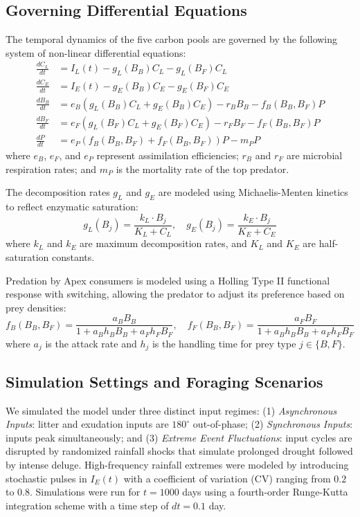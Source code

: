 \subsection{Governing Differential Equations}

The temporal dynamics of the five carbon pools are governed by the following system of non-linear differential equations:
\begin{align}
\frac{dC_L}{dt} &= I_L(t) - g_L(B_B) C_L - g_L(B_F) C_L \\
\frac{dC_E}{dt} &= I_E(t) - g_E(B_B) C_E - g_E(B_F) C_E \\
\frac{dB_B}{dt} &= e_B \left( g_L(B_B) C_L + g_E(B_B) C_E \right) - r_B B_B - f_B(B_B, B_F) P \\
\frac{dB_F}{dt} &= e_F \left( g_L(B_F) C_L + g_E(B_F) C_E \right) - r_F B_F - f_F(B_B, B_F) P \\
\frac{dP}{dt} &= e_P \left( f_B(B_B, B_F) + f_F(B_B, B_F) \right) P - m_P P
\end{align}
where $e_B$, $e_F$, and $e_P$ represent assimilation efficiencies; $r_B$ and $r_F$ are microbial respiration rates; and $m_P$ is the mortality rate of the top predator.

The decomposition rates $g_L$ and $g_E$ are modeled using Michaelis-Menten kinetics to reflect enzymatic saturation:
\begin{equation}
g_L(B_j) = \frac{k_L \cdot B_j}{K_L + C_L}, \quad g_E(B_j) = \frac{k_E \cdot B_j}{K_E + C_E}
\end{equation}
where $k_L$ and $k_E$ are maximum decomposition rates, and $K_L$ and $K_E$ are half-saturation constants.

Predation by Apex consumers is modeled using a Holling Type II functional response with switching, allowing the predator to adjust its preference based on prey densities:
\begin{equation}
f_B(B_B, B_F) = \frac{a_B B_B}{1 + a_B h_B B_B + a_F h_F B_F}, \quad f_F(B_B, B_F) = \frac{a_F B_F}{1 + a_B h_B B_B + a_F h_F B_F}
\end{equation}
where $a_j$ is the attack rate and $h_j$ is the handling time for prey type $j \in \{B, F\}$.

\subsection{Simulation Settings and Foraging Scenarios}

We simulated the model under three distinct input regimes: (1) \textit{Asynchronous Inputs}: litter and exudation inputs are $180^\circ$ out-of-phase; (2) \textit{Synchronous Inputs}: inputs peak simultaneously; and (3) \textit{Extreme Event Fluctuations}: input cycles are disrupted by randomized rainfall shocks that simulate prolonged drought followed by intense deluge. High-frequency rainfall extremes were modeled by introducing stochastic pulses in $I_E(t)$ with a coefficient of variation ($\text{CV}$) ranging from $0.2$ to $0.8$. Simulations were run for $t = 1000$ days using a fourth-order Runge-Kutta integration scheme with a time step of $dt = 0.1$ day.

